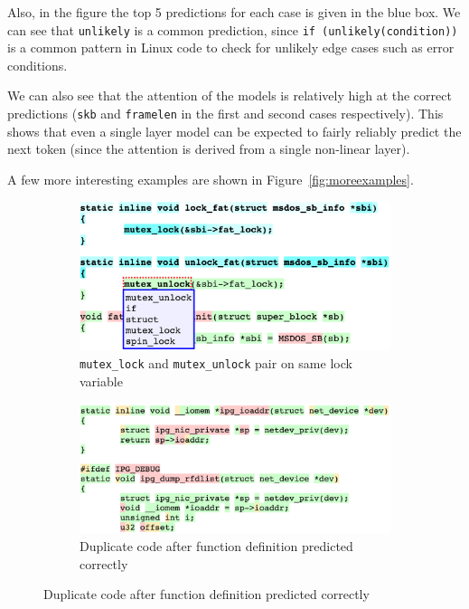 Also, in the figure the top 5 predictions for each case is given in the blue
box. We can see that {\tt unlikely} is a common prediction, since {\tt if
(unlikely(condition))} is a common pattern in Linux code to check for unlikely
edge cases such as error conditions.

We can also see that the attention of the models is relatively high at the
correct predictions ({\tt skb} and {\tt framelen} in the first and second cases
respectively). This shows that even a single layer model can be expected to
fairly reliably predict the next token (since the attention is derived from a
single non-linear layer).

A few more interesting examples are shown in Figure~\ref{fig:moreexamples}.

\begin{figure}[t!]
  \centering
\begin{subfigure}{\linewidth}
  \includegraphics[width=\linewidth]{figs/example10.png}
  \caption{{\tt mutex\_lock} and {\tt mutex\_unlock} pair on same lock variable}
  \label{fig:lockunlock}
\end{subfigure}
\begin{subfigure}{\linewidth}
  \includegraphics[width=\linewidth]{figs/example4.png}
  \caption{Duplicate code after function definition predicted correctly}
  \label{fig:duplicate}
\end{subfigure}

\end{figure}
